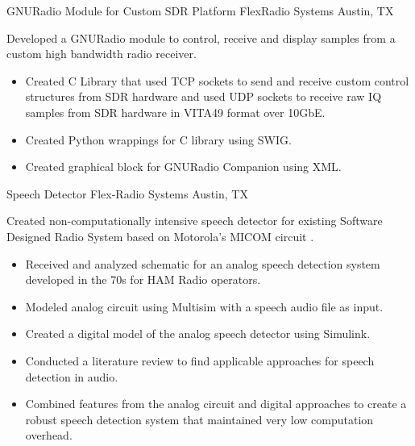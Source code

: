 \documentclass[11p,letterpaper,sans]{moderncv}
\begin{document}
{GNURadio Module for Custom SDR Platform}
{FlexRadio Systems}
{Austin, TX}
{}
{
Developed a GNURadio
  module to control, receive and display samples from a custom high
  bandwidth radio receiver.
\begin{itemize}
\item Created C Library that used TCP sockets to send and receive
  custom control structures from SDR hardware and used UDP sockets to
  receive raw IQ samples from SDR hardware in VITA49 format over
  10GbE.
\item Created Python wrappings for C library using SWIG.
\item Created graphical block for GNURadio Companion using XML.
\end{itemize}
}

{Speech Detector}
{Flex-Radio Systems}
{Austin, TX}
{}
{
Created non-computationally intensive speech detector
  for existing Software Designed Radio System based on Motorola's
  MICOM circuit \cite{VOXPaper}.
\begin{itemize}
\item Received and analyzed schematic for an analog speech detection
  system developed in the 70s for HAM Radio operators.
\item Modeled analog circuit using Multisim with a speech audio file
  as input.
\item Created a digital model of the analog speech detector using
  Simulink.
\item Conducted a literature review to find applicable approaches for
  speech detection in audio.
\item Combined features from the analog circuit and digital approaches
to create a robust speech detection system that maintained very low
computation overhead.
\end{itemize}
}

\end{document}
